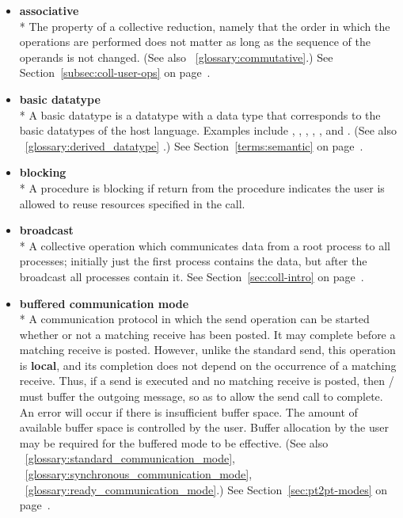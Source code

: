 \begin{itemize}
\label{glossary:associative}
\item \textbf{associative} \\*
The property of a collective reduction, namely that the order in which the operations are 
performed does not matter as long as the sequence of the operands is not changed. 
(See also ~\ref{glossary:commutative}.)
See Section~\ref{subsec:coll-user-ops} on page~\pageref{subsec:coll-user-ops}.

\label{glossary:basic_datatype}
\item \textbf{ basic datatype} \\*
A basic datatype is a datatype with a data type that corresponds to
the basic datatypes of the host language. Examples include
,
,
,
,
, and
.
(See also ~\ref{glossary:derived_datatype} .)
See Section~\ref{terms:semantic} on page~\pageref{terms:semantic}.

\label{glossary:blocking}
\item \textbf{ blocking} \\*
A procedure is blocking if return from the procedure indicates the user
is allowed to reuse resources specified in the call.

\label{glossary:broadcast}
\item \textbf{ broadcast} \\*
A collective operation which communicates data from a root process to all processes;
initially just the first process contains the data, but after the
broadcast all processes contain it.
See Section~\ref{sec:coll-intro} on page~\pageref{sec:coll-intro}.

\label{glossary:buffered_communication_mode}
\item \textbf{ buffered communication mode} \\*
A communication protocol in which the
send operation can be started whether or not a
matching receive has been posted.
It may complete before a matching receive is posted.  However, unlike
the standard send, this operation is {\bf local}, and its
completion does not depend on the occurrence of a matching receive.  Thus, if a
send is executed and no matching receive is posted, then \MPI/ must buffer the
outgoing message, so as to allow the send call to complete.   An error will
occur if there is insufficient buffer space.   The amount of available buffer
space is controlled by the user.
Buffer allocation by the user may be required for the buffered mode to be
effective. 
(See also ~\ref{glossary:standard_communication_mode}, 
~\ref{glossary:synchronous_communication_mode},
~\ref{glossary:ready_communication_mode}.)
See Section~\ref{sec:pt2pt-modes} on page~\pageref{sec:pt2pt-modes}.


\end{itemize}
